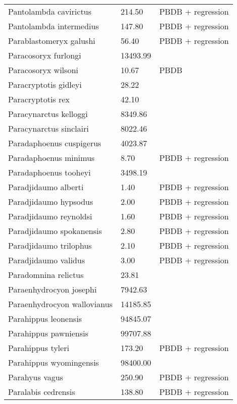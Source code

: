 \documentclass{article}
\begin{document}
\begin{center}
\begin{longtable}{p{} p{} p{}}
    Pantolambda cavirictus & 214.50 & PBDB + regression \\ 
    Pantolambda intermedius & 147.80 & PBDB + regression \\ 
    Parablastomeryx galushi & 56.40 & PBDB + regression \\ 
    Paracosoryx furlongi & 13493.99 & \cite{Tomiya2013} \\ 
    Paracosoryx wilsoni & 10.67 & PBDB \\ 
    Paracryptotis gidleyi & 28.22 & \cite{Tomiya2013} \\ 
    Paracryptotis rex & 42.10 & \cite{Tomiya2013} \\ 
    Paracynarctus kelloggi & 8349.86 & \cite{Tomiya2013} \\ 
    Paracynarctus sinclairi & 8022.46 & \cite{Tomiya2013} \\ 
    Paradaphoenus cuspigerus & 4023.87 & \cite{Tomiya2013} \\ 
    Paradaphoenus minimus & 8.70 & PBDB + regression \\ 
    Paradaphoenus tooheyi & 3498.19 & \cite{Tomiya2013} \\ 
    Paradjidaumo alberti & 1.40 & PBDB + regression \\ 
    Paradjidaumo hypsodus & 2.00 & PBDB + regression \\ 
    Paradjidaumo reynoldsi & 1.60 & PBDB + regression \\ 
    Paradjidaumo spokanensis & 2.80 & PBDB + regression \\ 
    Paradjidaumo trilophus & 2.10 & PBDB + regression \\ 
    Paradjidaumo validus & 3.00 & PBDB + regression \\ 
    Paradomnina relictus & 23.81 & \cite{Tomiya2013} \\ 
    Paraenhydrocyon josephi & 7942.63 & \cite{Tomiya2013} \\ 
    Paraenhydrocyon wallovianus & 14185.85 & \cite{Tomiya2013} \\ 
    Parahippus leonensis & 94845.07 & \cite{Tomiya2013} \\ 
    Parahippus pawniensis & 99707.88 & \cite{Tomiya2013} \\ 
    Parahippus tyleri & 173.20 & PBDB + regression \\ 
    Parahippus wyomingensis & 98400.00 & \cite{MacFadden1986} \\ 
    Parahyus vagus & 250.90 & PBDB + regression \\ 
    Paralabis cedrensis & 138.80 & PBDB + regression \\ 

\end{longtable}
\end{center}
\end{document}
